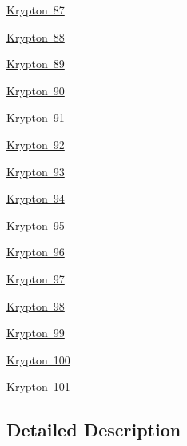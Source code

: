 \begin{DoxyCompactItemize}
\item 
\mbox{\hyperlink{group___isotope_const-_krypton-_kr87}{Krypton 87}}
\item 
\mbox{\hyperlink{group___isotope_const-_krypton-_kr88}{Krypton 88}}
\item 
\mbox{\hyperlink{group___isotope_const-_krypton-_kr89}{Krypton 89}}
\item 
\mbox{\hyperlink{group___isotope_const-_krypton-_kr90}{Krypton 90}}
\item 
\mbox{\hyperlink{group___isotope_const-_krypton-_kr91}{Krypton 91}}
\item 
\mbox{\hyperlink{group___isotope_const-_krypton-_kr92}{Krypton 92}}
\item 
\mbox{\hyperlink{group___isotope_const-_krypton-_kr93}{Krypton 93}}
\item 
\mbox{\hyperlink{group___isotope_const-_krypton-_kr94}{Krypton 94}}
\item 
\mbox{\hyperlink{group___isotope_const-_krypton-_kr95}{Krypton 95}}
\item 
\mbox{\hyperlink{group___isotope_const-_krypton-_kr96}{Krypton 96}}
\item 
\mbox{\hyperlink{group___isotope_const-_krypton-_kr97}{Krypton 97}}
\item 
\mbox{\hyperlink{group___isotope_const-_krypton-_kr98}{Krypton 98}}
\item 
\mbox{\hyperlink{group___isotope_const-_krypton-_kr99}{Krypton 99}}
\item 
\mbox{\hyperlink{group___isotope_const-_krypton-_kr100}{Krypton 100}}
\item 
\mbox{\hyperlink{group___isotope_const-_krypton-_kr101}{Krypton 101}}
\end{DoxyCompactItemize}


\subsection{Detailed Description}
